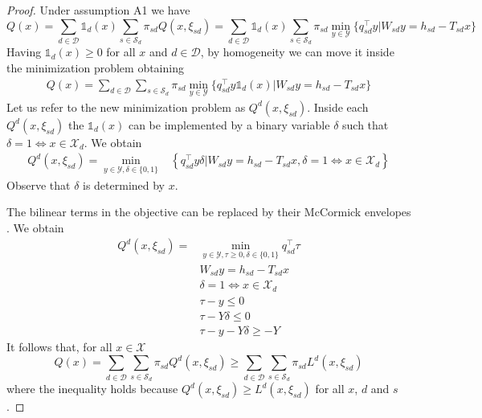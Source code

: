 \documentclass[12pt]{article}
\theoremstyle{thmstylethree}%
\newcommand{\mtc}[1] {\mathcal{#1}}
\def\Ind{\ensuremath{\mathbb{1}}}
\begin{document}
  \begin{proof}

    Under assumption A1 we have 
    $$Q(x)=\sum_{d\in\mtc{D}}\Ind_d(x)\sum_{s\in\mtc{S}_d}\pi_{sd}Q(x,\xi_{sd})=\sum_{d\in\mtc{D}}\Ind_d(x)\sum_{s\in\mtc{S}_d}\pi_{sd}\min_{y\in\mtc{Y}}\{q_{sd}^\top y\vert W_{sd}y=h_{sd}-T_{sd}x\}$$
    Having $\Ind_d(x)\geq 0$ for all $x$ and $d\in\mtc{D}$, by homogeneity we can move it inside the minimization problem obtaining
    \begin{align}
      Q(x)=\sum_{d\in\mtc{D}}\sum_{s\in\mtc{S}_d}\pi_{sd}\min_{y\in\mtc{Y}}\{q_{sd}^\top y\Ind_d(x)\vert W_{sd}y=h_{sd}-T_{sd}x\}
    \end{align}
    Let us refer to the new minimization problem as $Q^{d}(x,\xi_{sd})$.
    Inside each $Q^{d}(x,\xi_{sd})$ the $\Ind_d(x)$ can be implemented by a binary variable $\delta$ such that $\delta=1\iff x\in\mtc{X}_d$.
    We obtain
    \begin{align}Q^{d}(x,\xi_{sd})=\min_{y\in\mtc{Y},\delta\in\{0,1\}}&\left\{q_{sd}^\top y\delta\left\vert W_{sd}y=h_{sd}-T_{sd}x, \delta =1\iff x\in\mtc{X}_d\right.\right\}
    \end{align}
    Observe that $\delta$ is determined by $x$.

    The bilinear terms in the objective can be replaced by their McCormick envelopes \cite{Mcc76}. We obtain
    \begin{align}Q^{d}(x,\xi_{sd})=&\min_{y\in\mtc{Y},\tau\geq 0,\delta\in\{0,1\}}q_{sd}^\top \tau\\
                                                   & W_{sd}y=h_{sd}-T_{sd}x\\
                                                   &\delta =1\iff x\in\mtc{X}_d\\
                                                   &\tau-y \leq 0\\
                                                   &\tau-Y\delta\leq 0\\
                                                   &\tau-y-Y\delta\geq -Y
    \end{align}
    It follows that, for all $x\in\mtc{X}$
    $$Q(x)=\sum_{d\in\mtc{D}}\sum_{s\in\mtc{S}_d}\pi_{sd}Q^{d}(x,\xi_{sd})\geq \sum_{d\in\mtc{D}}\sum_{s\in\mtc{S}_d}\pi_{sd}L^{d}(x,\xi_{sd})$$
    where the inequality holds because $Q^{d}(x,\xi_{sd})\geq L^{d}(x,\xi_{sd})$ for all $x$, $d$ and $s$. %
  \end{proof}
\end{document}
